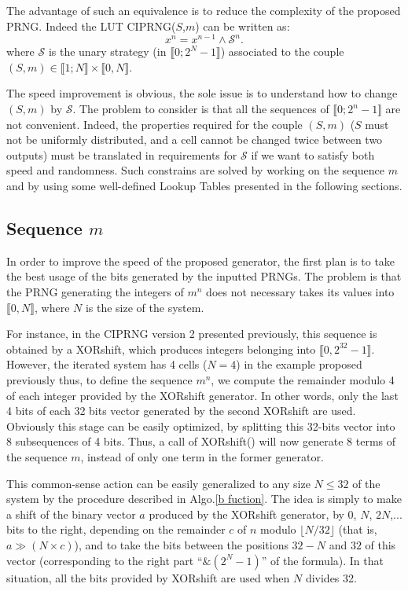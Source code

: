 The advantage of such an equivalence is to reduce the complexity of the proposed PRNG.
Indeed the LUT CIPRNG($S$,$m$) can be written as:
\begin{equation}
x^n = x^{n-1} \wedge \mathcal{S}^n.
\end{equation}
where $\mathcal{S}$ is the unary strategy (in $\llbracket 0; 2^N-1 \rrbracket$) associated 
to the couple $(S,m)\in \llbracket 1;N \rrbracket \times \llbracket 0,N \rrbracket$.

The speed improvement is obvious, the sole issue is to understand how to change $(S,m)$ by $\mathcal{S}$.
The problem to consider is that all the sequences of $\llbracket 0; 2^n-1 \rrbracket$ are not convenient.
Indeed, the properties required for the couple $(S,m)$ ($S$ must not be uniformly distributed, 
and a cell cannot be changed twice between two outputs) must be translated in requirements for 
$\mathcal{S}$ if we want to satisfy both speed and randomness.
Such constrains are solved by working on the sequence $m$ and by using some well-defined Lookup 
Tables presented in the following sections.

\subsection{Sequence $m$}
\label{LUT1}

In order to improve the speed of the proposed generator, 
the first plan is to take the best usage of the bits generated by the inputted PRNGs.
The problem is that the PRNG generating the integers of $m^n$ does not necessary takes its values 
into $\llbracket 0, N \rrbracket$, where $N$ is the size of the system.

For instance, in the CIPRNG version 2 presented previously, this sequence is obtained by a 
XORshift, which produces integers belonging into $\llbracket 0, 2^{32}-1 \rrbracket$.
However, the iterated system has 4 cells ($N=4$) in the example proposed previously thus, 
to define the sequence $m^n$, we compute the remainder modulo 4 of each integer provided by the XORshift generator.
In other words, only the last 4 bits of each 32 bits vector generated by the second XORshift are used.
Obviously this stage can be easily optimized, by splitting this 32-bits vector into 8 subsequences of 4 bits.
Thus, a call of XORshift() will now generate 8 terms of the sequence $m$, instead of only one term in the former generator.

This common-sense action can be easily generalized to any size $N \leqslant 32$ of 
the system by the procedure described in Algo.\ref{b fuction}. The idea is simply 
to make a shift of the binary vector $a$ produced by the XORshift generator, by 0, $N$, $2N$,... 
bits to the right, depending on the remainder $c$ of $n$ modulo $\lfloor N/32 \rfloor$ (that is, 
$a \gg (N \times c)$), and to take the bits between the positions $32-N$ and $32$ of this vector 
(corresponding to the right part ``$\& (2^N-1)$'' of the formula).
In that situation, all the bits provided by XORshift are used when $N$ divides 32.

